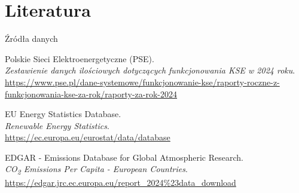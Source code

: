 \section{Literatura}

\begin{frame}{Źródła danych}
    \begin{thebibliography}{10}
        Polskie Sieci Elektroenergetyczne (PSE).\\
        \emph{Zestawienie danych ilościowych dotyczących funkcjonowania KSE w 2024 roku}.\\
        \url{https://www.pse.pl/dane-systemowe/funkcjonowanie-kse/raporty-roczne-z-funkcjonowania-kse-za-rok/raporty-za-rok-2024}

        EU Energy Statistics Database.\\
        \emph{Renewable Energy Statistics}.\\
        \url{https://ec.europa.eu/eurostat/data/database}
        
        EDGAR - Emissions Database for Global Atmospheric Research.\\
        \emph{CO\textsubscript{2} Emissions Per Capita - European Countries}.\\
        \url{https://edgar.jrc.ec.europa.eu/report_2024\%23data_download}

    \end{thebibliography}
\end{frame}
